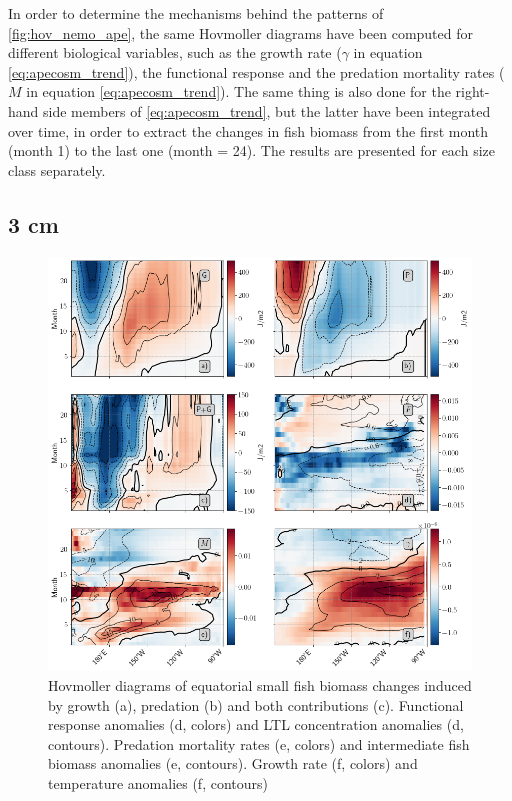 In order to determine the mechanisms behind the patterns of \ref{fig:hov_nemo_ape}, the same Hovmoller diagrams have been computed for different biological variables, such as the growth rate ($\gamma$ in equation \ref{eq:apecosm_trend}), the functional response and the predation mortality rates ($M$ in equation \ref{eq:apecosm_trend}). The same thing is also done for the right-hand side members of \ref{eq:apecosm_trend}, but the latter have been integrated over time, in order to extract the changes in fish biomass from the first month (month 1) to the last one (month = 24). The results are presented for each size class separately.

\subsection{3 cm}

\begin{figure}[h!tp]
	\centering
	\includegraphics[scale=0.4]{figs/hov_compo_l_3.png}	
	\caption{Hovmoller diagrams of equatorial small fish biomass changes induced by growth (a), predation (b) and both contributions (c). Functional response anomalies (d, colors) and LTL concentration anomalies (d, contours). Predation mortality rates (e, colors) and intermediate fish biomass anomalies (e, contours). Growth rate (f, colors) and temperature anomalies (f, contours)}	
	\label{fig:hov_ape_trends_3}
\end{figure}

